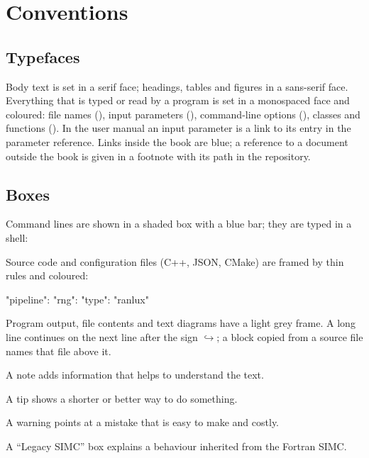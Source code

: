 \chapter*{Conventions}\label{conventions}

\section*{Typefaces}
Body text is set in a serif face; headings, tables and figures in a sans-serif face. Everything that is typed or read
by a program is set in a monospaced face and coloured: file names (), input parameters
(), command-line options (), classes and functions (). In the
user manual an input parameter is a link to its entry in the parameter reference. Links inside the book are blue;
a reference to a document outside the book is given in a footnote with its path in the repository.

\section*{Boxes}
Command lines are shown in a shaded box with a blue bar; they are typed in a shell:
Source code and configuration files (C++, JSON, CMake) are framed by thin rules and coloured:
\begin{simccode}[basicstyle=\ttfamily\footnotesize, style=simcjson]
{"pipeline": {"rng": {"type": "ranlux"}}}
\end{simccode}
Program output, file contents and text diagrams have a light grey frame. A long line continues on the next line
after the sign \textcolor{simcblue}{$\hookrightarrow$}; a block copied from a source file names that file above it.

\begin{simcnote}
A note adds information that helps to understand the text.
\end{simcnote}
\begin{simctip}
A tip shows a shorter or better way to do something.
\end{simctip}
\begin{simcwarning}
A warning points at a mistake that is easy to make and costly.
\end{simcwarning}
\begin{simclegacy}
A ``Legacy SIMC'' box explains a behaviour inherited from the Fortran SIMC.
\end{simclegacy}

